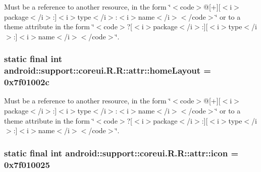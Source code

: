 Must be a reference to another resource, in the form \char`\"{}$<$code$>$@\mbox{[}+\mbox{]}\mbox{[}$<$i$>$package$<$/i$>$:\mbox{]}$<$i$>$type$<$/i$>$:$<$i$>$name$<$/i$>$$<$/code$>$\char`\"{} or to a theme attribute in the form \char`\"{}$<$code$>$?\mbox{[}$<$i$>$package$<$/i$>$:\mbox{]}\mbox{[}$<$i$>$type$<$/i$>$:\mbox{]}$<$i$>$name$<$/i$>$$<$/code$>$\char`\"{}. \hypertarget{classandroid_1_1support_1_1coreui_1_1_r_1_1attr_9e013a68eca11e8962b79e5c010d48d6}{
\subsubsection[{homeLayout}]{\setlength{\rightskip}{0pt plus 5cm}static final int android::support::coreui.R.R::attr::homeLayout = 0x7f01002c}}
\label{classandroid_1_1support_1_1coreui_1_1_r_1_1attr_9e013a68eca11e8962b79e5c010d48d6}


Must be a reference to another resource, in the form \char`\"{}$<$code$>$@\mbox{[}+\mbox{]}\mbox{[}$<$i$>$package$<$/i$>$:\mbox{]}$<$i$>$type$<$/i$>$:$<$i$>$name$<$/i$>$$<$/code$>$\char`\"{} or to a theme attribute in the form \char`\"{}$<$code$>$?\mbox{[}$<$i$>$package$<$/i$>$:\mbox{]}\mbox{[}$<$i$>$type$<$/i$>$:\mbox{]}$<$i$>$name$<$/i$>$$<$/code$>$\char`\"{}. \hypertarget{classandroid_1_1support_1_1coreui_1_1_r_1_1attr_74364f1ee9702c5250aceb469aa672d3}{
\subsubsection[{icon}]{\setlength{\rightskip}{0pt plus 5cm}static final int android::support::coreui.R.R::attr::icon = 0x7f010025}}
\label{classandroid_1_1support_1_1coreui_1_1_r_1_1attr_74364f1ee9702c5250aceb469aa672d3}


